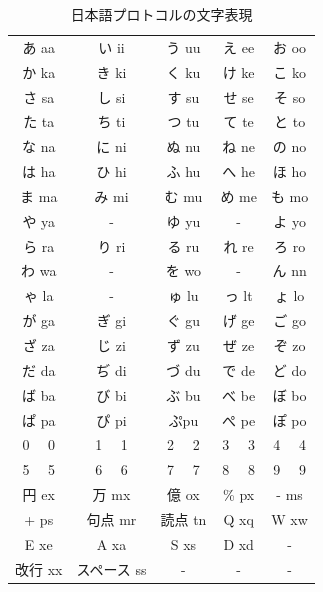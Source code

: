 \documentclass[a4j]{jarticle}
\begin{document}
  \begin{table}[H]
    \caption{日本語プロトコルの文字表現}
  \label{jpp}
  \begin{center}
      \begin{tabular}{c|c|c|c|c}\hline
あ aa & い ii & う uu & え ee & お oo \\ 
か ka & き ki & く ku & け ke & こ ko \\ 
さ sa & し si & す su & せ se & そ so \\ 
た ta & ち ti & つ tu & て te & と to \\ 
な na & に ni & ぬ nu & ね ne & の no \\ 
は ha & ひ hi & ふ hu & へ he & ほ ho \\ 
ま ma & み mi & む mu & め me & も mo \\ 
や ya & -  & ゆ yu & -  & よ yo \\ 
ら ra & り ri & る ru & れ re & ろ ro \\ 
わ wa & -  & を wo & -  & ん nn \\ 
ゃ la & - & ゅ lu & っ lt & ょ lo \\ 
が ga & ぎ gi & ぐ gu & げ ge & ご go \\ 
ざ za & じ zi & ず zu & ぜ ze & ぞ zo \\
だ da & ぢ di & づ du & で de & ど do \\
ば ba & び bi & ぶ bu & べ be & ぼ bo \\ 
ぱ pa & ぴ pi & ぷpu &  ぺ pe & ぽ po \\ 
0 　0 & 1 　1 & 2 　2 & 3 　3 & 4 　4 \\ 
5 　5 & 6 　6 & 7 　7 & 8 　8 & 9 　9 \\ 
円 ex & 万 mx & 億 ox & \% px & - ms \\ 
+ ps & 句点 mr & 読点 tn & Q xq & W xw \\ 
E xe & A xa & S xs & D xd & - \\ 
改行 xx & スペース ss & - & - & - \\ \hline
      \end{tabular}
  \end{center}
  \end{table}
  
\end{document}
